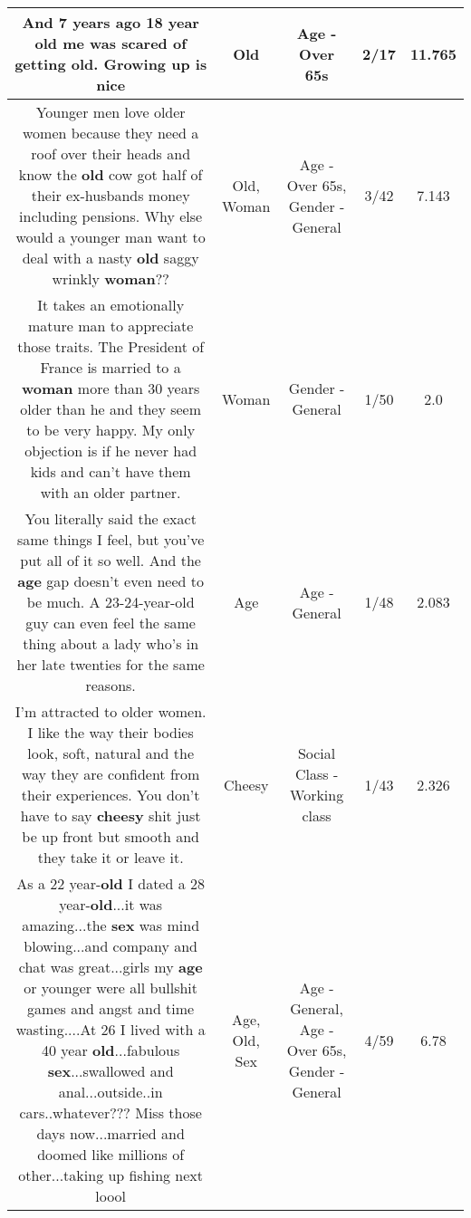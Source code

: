 \documentclass[11pt]{article}
\newlength\mylength
\begin{document}
\begin{center}
\begin{longtable}{|C{.65\mylength}|C{.30\mylength}|C{.12\mylength}|C{.12\mylength}|C{.12\mylength}|}
  \small And 7 years ago 18 year \textbf{old} me was scared of getting \textbf{old}. Growing up is nice\normalsize   & Old & Age - Over 65s & 2/17 & 11.765 \\  \hline
  \small Younger men love older women because they need a roof over their heads and know the \textbf{old} cow got half of their ex-husbands money including pensions. Why else would a younger man want to deal with a nasty \textbf{old} saggy wrinkly \textbf{woman}??\normalsize   & Old, Woman & Age - Over 65s, Gender - General & 3/42 & 7.143 \\  \hline
  \small It takes an emotionally mature man to appreciate those traits.  The President of France is married to a \textbf{woman} more than 30 years older than he and they seem to be very happy.  My only objection is if he never had kids and can't have them with an older partner.\normalsize   & Woman & Gender - General & 1/50 & 2.0 \\  \hline
  \small You literally said the exact same things I feel, but you've put all of it so well. And the \textbf{age} gap doesn't even need to be much. A 23-24-year-old guy can even feel the same thing about a lady who's in her late twenties for the same reasons.\normalsize   & Age & Age - General & 1/48 & 2.083 \\  \hline
  \small I'm attracted to older women. I like the way their bodies look, soft, natural and the way they are confident from their experiences. You don't have to say \textbf{cheesy} shit just be up front but smooth and they take it or leave it.\normalsize   & Cheesy & Social Class - Working class & 1/43 & 2.326 \\  \hline
  \small As a 22 year-\textbf{old} I dated a 28 year-\textbf{old}...it was amazing...the \textbf{sex} was mind blowing...and company and chat was great...girls my \textbf{age} or younger were all bullshit games and angst and time wasting....At 26 I lived with a 40 year \textbf{old}...fabulous \textbf{sex}...swallowed and anal...outside..in cars..whatever??? Miss those days now...married and doomed like millions of other...taking up fishing next loool\normalsize   & Age, Old, Sex & Age - General, Age - Over 65s, Gender - General & 4/59 & 6.78 \\  \hline

\end{longtable}
\end{center}
\end{document}
